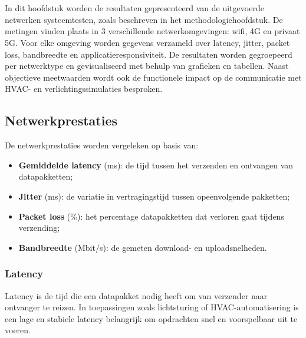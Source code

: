 \chapter{}%
\label{ch:resultaten}

In dit hoofdstuk worden de resultaten gepresenteerd van de uitgevoerde netwerken systeemtesten, zoals beschreven in het methodologiehoofdstuk. De metingen vinden plaats in 3 verschillende netwerkomgevingen: wifi, 4G en privaat 5G. Voor elke omgeving worden gegevens verzameld over latency, jitter, packet loss, bandbreedte en applicatieresponsiviteit.
De resultaten worden gegroepeerd per netwerktype en gevisualiseerd met behulp van grafieken en tabellen. Naast objectieve meetwaarden wordt ook de functionele impact op de communicatie met HVAC- en verlichtingssimulaties besproken.


\section{Netwerkprestaties}

De netwerkprestaties worden vergeleken op basis van:

\begin{itemize}
    \item \textbf{Gemiddelde latency} (ms): de tijd tussen het verzenden en ontvangen van datapakketten;
    \item \textbf{Jitter} (ms): de variatie in vertragingstijd tussen opeenvolgende pakketten;
    \item \textbf{Packet loss} (\%): het percentage datapakketten dat verloren gaat tijdens verzending;
    \item \textbf{Bandbreedte} (Mbit/s): de gemeten download- en uploadsnelheden.
\end{itemize}

\subsection{Latency}
Latency is de tijd die een datapakket nodig heeft om van verzender naar ontvanger te reizen. In toepassingen zoals lichtsturing of HVAC-automatisering is een lage en stabiele latency belangrijk om opdrachten snel en voorspelbaar uit te voeren.

